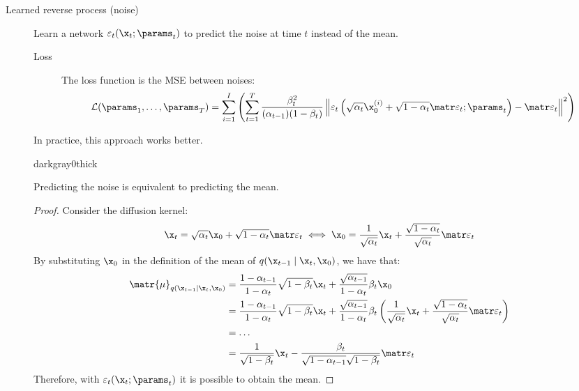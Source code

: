 \begin{description}
    \item[Learned reverse process (noise)] 
        Learn a network $\varepsilon_t(\x_t; \params_t)$ to predict the noise at time $t$ instead of the mean.

        \begin{description}
            \item[Loss]
                The loss function is the MSE between noises:
                \[ 
                    \mathcal{L}(\params_1, \dots, \params_T) = 
                    \sum_{i=1}^{I} \left( \sum_{t=1}^{T} \frac{\beta_t^2}{(\alpha_{t-1})(1-\beta_t)} \left\Vert \varepsilon_t\left( \sqrt{\alpha_t} \x_0^{(i)} + \sqrt{1-\alpha_t} \noise_t; \params_t \right) - \noise_t \right\Vert^2 \right)
                \]
        \end{description}

        \begin{remark}
            In practice, this approach works better.
        \end{remark}

        \begin{marginbar}{darkgray}{0}{thick}
        \begin{theorem}
            Predicting the noise is equivalent to predicting the mean.

            \begin{proof}
                Consider the diffusion kernel:
                \[ \x_t = \sqrt{\alpha_t} \x_0 + \sqrt{1-\alpha_t} \noise_t \iff \x_0 = \frac{1}{\sqrt{\alpha_t}}\x_t + \frac{\sqrt{1-\alpha_t}}{\sqrt{\alpha_t}}\noise_t \]
                By substituting $\x_0$ in the definition of the mean of $q(\x_{t-1} \mid \x_t, \x_0)$, we have that:
                \[
                    \begin{split}
                        \matr{\mu}_{q(\x_{t-1} \mid \x_t, \x_0)} &= \frac{1-\alpha_{t-1}}{1-\alpha_t} \sqrt{1-\beta_t} \x_t + \frac{\sqrt{\alpha_{t-1}}}{1-\alpha_t} \beta_t \x_0 \\
                        &= \frac{1-\alpha_{t-1}}{1-\alpha_t} \sqrt{1-\beta_t} \x_t + \frac{\sqrt{\alpha_{t-1}}}{1-\alpha_t} \beta_t \left( \frac{1}{\sqrt{\alpha_t}}\x_t + \frac{\sqrt{1-\alpha_t}}{\sqrt{\alpha_t}}\noise_t \right) \\
                        &= \dots \\
                        &= \frac{1}{\sqrt{1-\beta_t}}\x_t - \frac{\beta_t}{\sqrt{1-\alpha_{t-1}}\sqrt{1-\beta_t}} \noise_t
                    \end{split}
                \]
                Therefore, with $\varepsilon_t(\x_t; \params_t)$ it is possible to obtain the mean.


\end{proof}
\end{theorem}
\end{marginbar}
\end{description}
